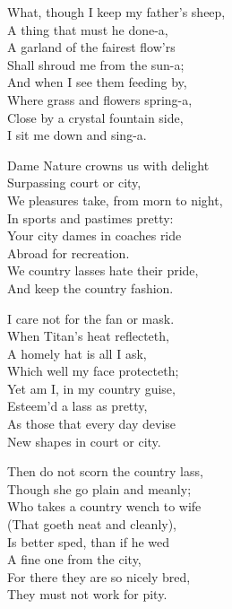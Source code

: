 


\settowidth{\versewidth}{Close by a crystal fountain side,}
\begin{dcverse}\footnotesizer
\begin{altverse}
What, though I keep my father’s sheep,\\
A thing that must he done-a,\\
A garland of the fairest flow’rs\\
Shall shroud me from the sun-a;\\
And when I see them feeding by,\\
Where grass and flowers spring-a,\\
Close by a crystal fountain side,\\
I sit me down and sing-a.
\end{altverse}

\begin{altverse}
Dame Nature crowns us with delight\\
Surpassing court or city,\\
We pleasures take, from morn to night,\\
In sports and pastimes pretty:\\
Your city dames in coaches ride\\
Abroad for recreation.\\
We country lasses hate their pride,\\
And keep the country fashion.
\end{altverse}

\begin{altverse}
I care not for the fan or mask.\\
When Titan’s heat reflecteth,\\
A homely hat is all I ask,\\
Which well my face protecteth;\\
Yet am I, in my country guise,\\
Esteem’d a lass as pretty,\\
As those that every day devise\\
New shapes in court or city.
\end{altverse}

\begin{altverse}
Then do not scorn the country lass,\\
Though she go plain and meanly;\\
Who takes a country wench to wife\\
(That goeth neat and cleanly),\\
Is better sped, than if he wed\\
A fine one from the city,\\
For there they are so nicely bred,\\
They must not work for pity.
\end{altverse}
\end{dcverse}
\pagebreak%

